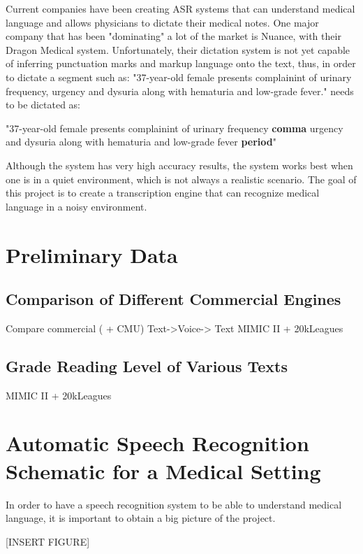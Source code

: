 Current companies have been creating ASR systems that can understand medical language and allows physicians to dictate their medical notes. One major company that has been "dominating" a lot of the market is Nuance, with their Dragon Medical system. Unfortunately, their dictation system is not yet capable of inferring punctuation marks and markup language onto the text, thus, in order to dictate a segment such as: "37-year-old female presents complainint of urinary frequency, urgency and dysuria along with hematuria and low-grade fever." needs to be dictated as:

\begin{center}
    "37-year-old female presents complainint of urinary frequency \textbf{comma} urgency and dysuria along with hematuria and low-grade fever \textbf{period}"
\end{center}

Although the system has very high accuracy results, the system works best when one is in a quiet environment, which is not always a realistic scenario. The goal of this project is to create a transcription engine that can recognize medical language in a noisy environment.

\section{Preliminary Data}

\subsection{Comparison of Different Commercial Engines}

Compare commercial ( + CMU)
Text->Voice-> Text
MIMIC II + 20kLeagues


\subsection{Grade Reading Level of Various Texts}
MIMIC II + 20kLeagues


\section{Automatic Speech Recognition Schematic for a Medical Setting}

In order to have a speech recognition system to be able to understand medical language, it is important to obtain a big picture of the project.


[INSERT FIGURE]


